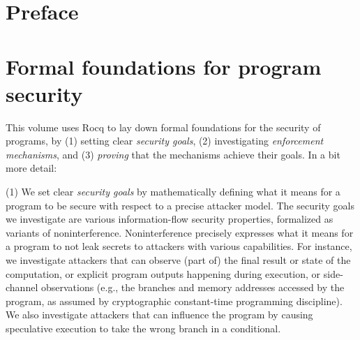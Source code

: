 \documentclass[12pt]{report}
\begin{document}

\begin{coqdoccode}
\end{coqdoccode}
\section{Preface}


\begin{coqdoccode}
\coqdocemptyline
\end{coqdoccode}
\section{Formal foundations for program security}



 This volume uses Rocq to lay down formal foundations for the security of
    programs, by (1) setting clear \textit{security goals}, (2) investigating
    \textit{enforcement mechanisms}, and (3) \textit{proving} that the mechanisms achieve
    their goals.  In a bit more detail: 

 (1) We set clear \textit{security goals} by mathematically defining what it means
    for a program to be secure with respect to a precise attacker model.
    The security goals we investigate are various information-flow
    security properties, formalized as variants of noninterference.
    Noninterference precisely expresses what it means for a program
    to not leak secrets to attackers with various capabilities.
    For instance, we investigate attackers that can observe (part of)
    the final result or state of the computation, or explicit program outputs
    happening during execution, or side-channel observations
    (e.g., the branches and memory addresses accessed by the program,
    as assumed by cryptographic constant-time programming discipline).
    We also investigate attackers that can influence the program by causing
    speculative execution to take the wrong branch in a conditional. 
\end{document}
